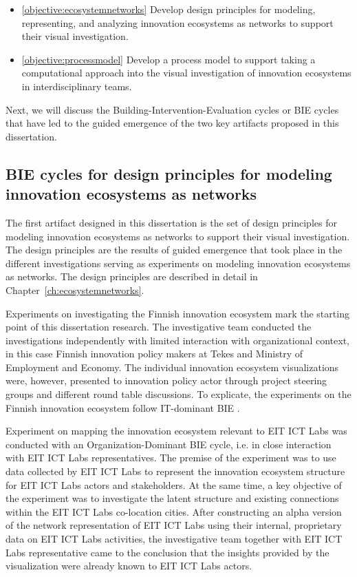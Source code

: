 \begin{itemize}
	\item\ref{objective:ecosystemnetworks} Develop design principles for modeling, representing, and analyzing innovation ecosystems as networks to support their visual investigation.
    \item\ref{objective:processmodel} Develop a process model to support taking a computational approach into the visual investigation of innovation ecosystems in interdisciplinary teams.
\end{itemize}

Next, we will discuss the Building-Intervention-Evaluation cycles or BIE cycles \citep{Sein2011ActionResearch} that have led to the guided emergence of the two key artifacts proposed in this dissertation.

\subsection{BIE cycles for design principles for modeling innovation ecosystems as networks}

The first artifact designed in this dissertation is the set of design principles for modeling innovation ecosystems as networks to support their visual investigation. The design principles are the results of guided emergence that took place in the different investigations serving as experiments on modeling innovation ecosystems as networks. The design principles are described in detail in Chapter~\ref{ch:ecosystemnetworks}. 

Experiments on investigating the Finnish innovation ecosystem mark the starting point of this dissertation research. The investigative team conducted the investigations independently with limited interaction with organizational context, in this case Finnish innovation policy makers at Tekes and Ministry of Employment and Economy. The individual innovation ecosystem visualizations were, however, presented to innovation policy actor through project steering groups and different round table discussions. To explicate, the experiments on the Finnish innovation ecosystem follow IT-dominant BIE \citep[cf.][]{Sein2011ActionResearch}.

Experiment on mapping the innovation ecosystem relevant to EIT ICT Labs was conducted with an Organization-Dominant BIE cycle, i.e. in close interaction with EIT ICT Labs representatives. The premise of the experiment was to use data collected by EIT ICT Labs to represent the innovation ecosystem structure for EIT ICT Labs actors and stakeholders. At the same time, a key objective of the experiment was to investigate the latent structure and existing connections within the EIT ICT Labs co-location cities. After constructing an alpha version of the network representation of EIT ICT Labs using their internal, proprietary data on EIT ICT Labs activities, the investigative team together with EIT ICT Labs representative came to the conclusion that the insights provided by the visualization were already known to EIT ICT Labs actors. 

